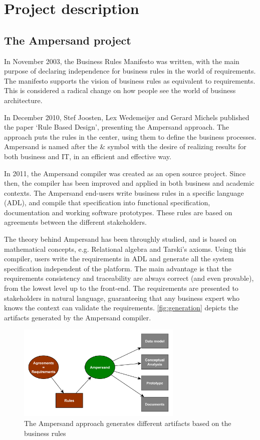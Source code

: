 \section{Project description}
\label{sec:project-description}

\subsection{The Ampersand project}
In November 2003, the Business Rules Manifesto\cite{business-rules} was written, with the main purpose of declaring independence for business rules in the world of requirements.
The manifesto supports the vision of business rules as equivalent to requirements.
This is considered a radical change on how people see the world of business architecture.

In December 2010, Stef Joosten, Lex Wedemeijer and Gerard Michels published the paper `Rule Based Design', presenting the Ampersand approach.
The approach puts the rules in the center, using them to define the business processes.
Ampersand is named after the \& symbol with the desire of realizing results for both business and IT, in an efficient and effective way.

In 2011, the Ampersand compiler was created as an open source project.
Since then, the compiler has been improved and applied in both business and academic contexts.
The Ampersand end-users write business rules in a specific language (ADL), and compile that specification into functional specification, documentation and working software prototypes.
%
These rules are based on agreements between the different stakeholders.

The theory behind Ampersand has been throughly studied, and is based on mathe\-matical concepts, e.g. Relational algebra and Tarski's axioms.
Using this compiler, users write the requirements in ADL and generate all the system specification independent of the platform.
The main advantage is that the requirements consistency and traceability are always correct (and even provable), from the lowest level up to the front-end.
The requirements are presented to stakeholders in natural language, guaranteeing that any business expert who knows the context can validate the requirements.
\autoref{fig:generation} depicts the artifacts generated by the Ampersand compiler.
%
\begin{figure}[htb]
	\centering
	\includegraphics[width=0.7\textwidth]{Figures/Generation}
	\caption[Generated artifacts]{The Ampersand approach generates different artifacts based on the business rules}
	\label{fig:generation}
\end{figure}

